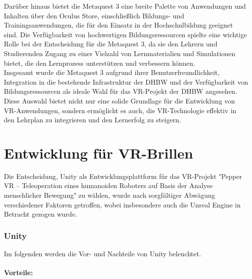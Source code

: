 \noindent
Darüber hinaus bietet die Metaquest 3 eine breite Palette von Anwendungen und Inhalten über den Oculus Store, einschließlich Bildungs- und Trainingsanwendungen, die für den Einsatz in der Hochschulbildung geeignet sind. Die Verfügbarkeit von hochwertigen Bildungsressourcen spielte eine wichtige Rolle bei der Entscheidung für die Metaquest 3, da sie den Lehrern und Studierenden Zugang zu einer Vielzahl von Lernmaterialien und Simulationen bietet, die den Lernprozess unterstützen und verbessern können.
\\

\noindent
Insgesamt wurde die Metaquest 3 aufgrund ihrer Benutzerfreundlichkeit, Integration in die bestehende Infrastruktur der DHBW und der Verfügbarkeit von Bildungsressourcen als ideale Wahl für das VR-Projekt der DHBW angesehen. Diese Auswahl bietet nicht nur eine solide Grundlage für die Entwicklung von VR-Anwendungen, sondern ermöglicht es auch, die VR-Technologie effektiv in den Lehrplan zu integrieren und den Lernerfolg zu steigern.
\section{Entwicklung für VR-Brillen}
Die Entscheidung, Unity als Entwicklungsplattform für das VR-Projekt "Pepper VR – Teleoperation eines humanoiden Roboters auf Basis der Analyse menschlicher Bewegung" zu wählen, wurde nach sorgfältiger Abwägung verschiedener Faktoren getroffen, wobei insbesondere auch die Unreal Engine in Betracht gezogen wurde.

\subsubsection{Unity}
Im folgenden werden die Vor- und Nachteile von Unity beleuchtet.
\paragraph{Vorteile:}


